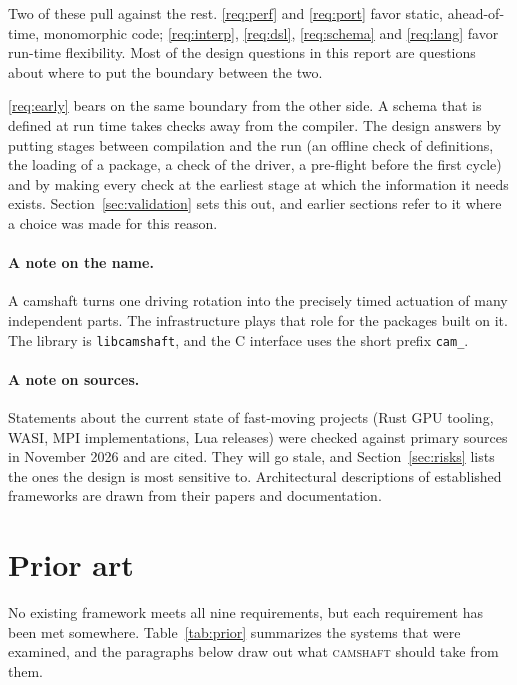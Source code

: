 \documentclass[11pt,a4paper]{article}
\newcommand{\camshaft}{\textsc{camshaft}}
\newcommand{\code}[1]{\texttt{#1}}
\begin{document}
Two of these pull against the rest.  \ref{req:perf} and \ref{req:port} favor
static, ahead-of-time, monomorphic code; \ref{req:interp}, \ref{req:dsl},
\ref{req:schema} and \ref{req:lang} favor run-time flexibility.  Most of the
design questions in this report are questions about where to put the boundary
between the two.

\ref{req:early} bears on the same boundary from the other side.  A schema
that is defined at run time takes checks away from the compiler.  The design
answers by putting stages between compilation and the run (an offline check
of definitions, the loading of a package, a check of the driver, a
pre-flight before the first cycle) and by making every check at the earliest
stage at which the information it needs exists.  Section~\ref{sec:validation}
sets this out, and earlier sections refer to it where a choice was made for
this reason.

\paragraph{A note on the name.}  A camshaft turns one driving rotation into
the precisely timed actuation of many independent parts.  The infrastructure
plays that role for the packages built on it.  The library is
\code{libcamshaft}, and the C interface uses the short prefix \code{cam\_}.

\paragraph{A note on sources.}  Statements about the current state of fast-moving
projects (Rust GPU tooling, WASI, MPI implementations, Lua releases) were
checked against primary sources in November 2026 and are cited.  They will go
stale, and Section~\ref{sec:risks} lists the ones the design is most sensitive
to.  Architectural descriptions of established frameworks are drawn from their
papers and documentation.

\section{Prior art}
\label{sec:prior}

No existing framework meets all nine requirements, but each requirement has
been met somewhere.  Table~\ref{tab:prior} summarizes the systems that were
examined, and the paragraphs below draw out what \camshaft{} should take from
them.
\end{document}
